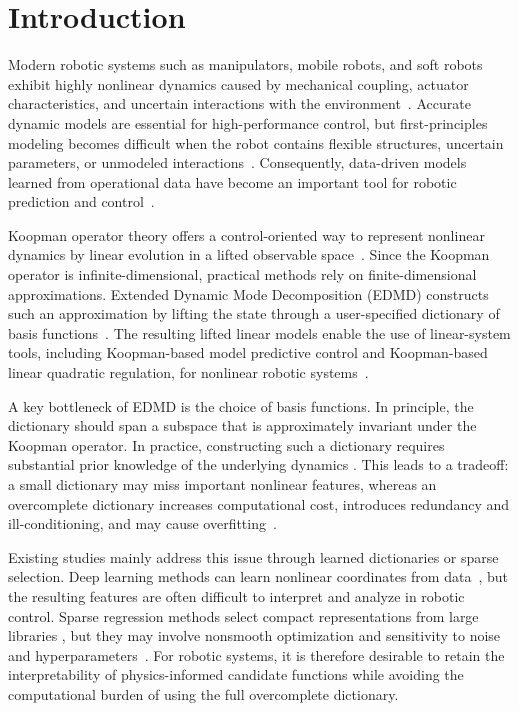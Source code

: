 \documentclass[final,3p,twocolumn,times]{elsarticle}
\begin{document}
\section{Introduction}
Modern robotic systems such as manipulators, mobile robots,
and soft robots exhibit highly nonlinear dynamics caused by mechanical
coupling, actuator characteristics, and uncertain interactions with the
environment~\cite{Brunton2022,DellaSantina2023}. Accurate dynamic models are
essential for high-performance control, but first-principles modeling becomes
difficult when the robot contains flexible structures, uncertain parameters, or
unmodeled interactions~\cite{Mamakoukas2021TRO}. Consequently,
data-driven models learned from operational data have become an important tool
for robotic prediction and control~\cite{Brunke2022,Tang2025survey,LiSu2026TCST,LiEtAl2026TCYB}.

Koopman operator theory offers a control-oriented way to
represent nonlinear dynamics by linear evolution in a lifted observable
space~\cite{Koopman1931,Korda2018conv}. Since the Koopman operator is
infinite-dimensional, practical methods rely on finite-dimensional
approximations. Extended Dynamic Mode Decomposition (EDMD) constructs such an
approximation by lifting the state through a user-specified dictionary of basis
functions~\cite{Williams2015EDMD,Korda2018conv}. The resulting lifted linear
models enable the use of linear-system tools, including Koopman-based model
predictive control and Koopman-based linear quadratic regulation, for nonlinear
robotic systems~\cite{Proctor2016DMDc,Korda2018MPC,Brunton2016Koopman}.

A key bottleneck of EDMD is the choice of basis functions.
In principle, the dictionary should span a subspace that is approximately
invariant under the Koopman operator. In practice, constructing such a
dictionary requires substantial prior knowledge of the underlying dynamics
\cite{Mauroy2019}. This leads to a tradeoff: a small dictionary may miss
important nonlinear features, whereas an overcomplete dictionary increases
computational cost, introduces redundancy and ill-conditioning, and may cause
overfitting~\cite{Mamakoukas2021TRO,ShiKarydis2022RAL}.

Existing studies mainly address this issue through learned dictionaries or
sparse selection. Deep learning methods can learn nonlinear coordinates from
data~\cite{Lusch2018,ShiMeng2022RAL,Ren2023TMech}, but the resulting features
are often difficult to interpret and analyze in robotic control. Sparse
regression methods select compact representations from large libraries
\cite{Li2017,Zhang2022Automatica}, but they may involve nonsmooth optimization
and sensitivity to noise and hyperparameters~\cite{WangEtAl2023RAL}. For robotic
systems, it is therefore desirable to retain the interpretability of
physics-informed candidate functions while avoiding the computational burden of
using the full overcomplete dictionary.
\end{document}
